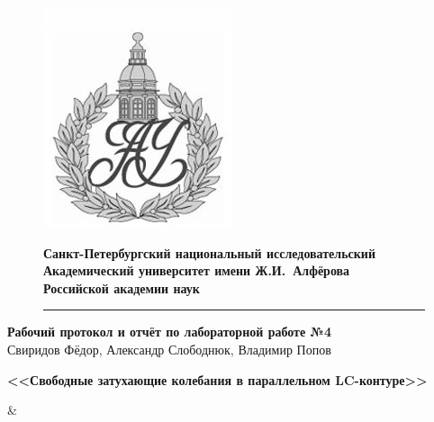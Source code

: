 \documentclass[a4paper]{article}
\begin{document}
	\begin{figure}[htb]
		\begin{minipage}[c]{0.12\textwidth}
			\includegraphics[scale=0.25]{AU}
		\end{minipage}
		\hfill
		\begin{minipage}[t]{0.9\textwidth}
			{\Large\bfseries Санкт-Петербургский национальный исследовательский Академический университет имени Ж.И.~Алфёрова\\Российской академии наук}
		\end{minipage}
		\rule{164mm}{0.3mm}
	\end{figure}
	
	\begin{center}
		{\large\textbf{Рабочий протокол и отчёт по лабораторной работе №4 }}\\
		Свиридов Фёдор, Александр Слободнюк, Владимир Попов
	\end{center}
	\begin{center}
		\Large\bfseries{<<Свободные затухающие колебания в параллельном LC-контуре>>}\\
	\end{center}
	

{  \X & \Y}

	
\end{document}

